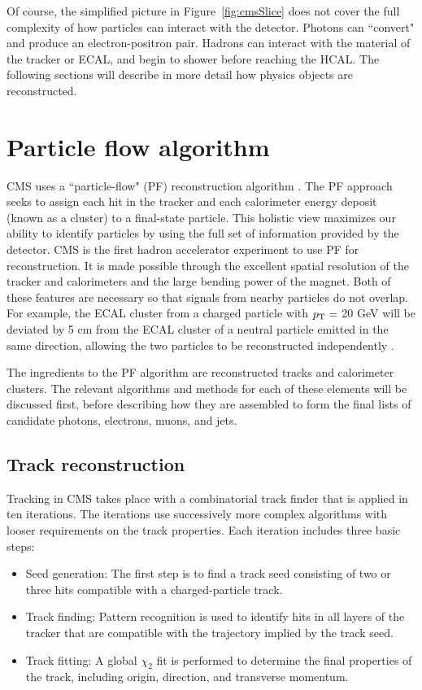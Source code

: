 Of course, the simplified picture in Figure~\ref{fig:cmsSlice} does not cover the full complexity of how particles can interact with the detector. Photons can ``convert" and produce an electron-positron pair. Hadrons can interact with the material of the tracker or ECAL, and begin to shower before reaching the HCAL. The following sections will describe in more detail how physics objects are reconstructed. 


\section{Particle flow algorithm}
\label{sec:ParticleFlow}
CMS uses a ``particle-flow" (PF) reconstruction algorithm \cite{ParticleFlow}. The PF approach seeks to assign each hit in the tracker and each calorimeter energy deposit (known as a cluster) to a final-state particle. This holistic view maximizes our ability to identify particles by using the full set of information provided by the detector. CMS is the first hadron accelerator experiment to use PF for reconstruction. It is made possible through the excellent spatial resolution of the tracker and calorimeters and the large bending power of the magnet. Both of these features are necessary so that signals from nearby particles do not overlap. For example, the ECAL cluster from a charged particle with $p_{\mathrm{T}} =$ 20 GeV will be deviated by 5 cm from the ECAL cluster of a neutral particle emitted in the same direction, allowing the two particles to be reconstructed independently \cite{ParticleFlow}.

The ingredients to the PF algorithm are reconstructed tracks and calorimeter clusters. The relevant algorithms and methods for each of these elements will be discussed first, before describing how they are assembled to form the final lists of candidate photons, electrons, muons, and jets. 

\subsection{Track reconstruction}
\label{sec:trackReco}
Tracking in CMS takes place with a combinatorial track finder that is applied in ten iterations. The iterations use successively more complex algorithms with looser requirements on the track properties. Each iteration includes three basic steps:
\begin{itemize}
\item Seed generation: The first step is to find a track seed consisting of two or three hits compatible with a charged-particle track.
\item Track finding: Pattern recognition is used to identify hits in all layers of the tracker that are compatible with the trajectory implied by the track seed. 
\item Track fitting: A global $\chi_2$ fit is performed to determine the final properties of the track, including origin, direction, and transverse momentum. 
\end{itemize}


